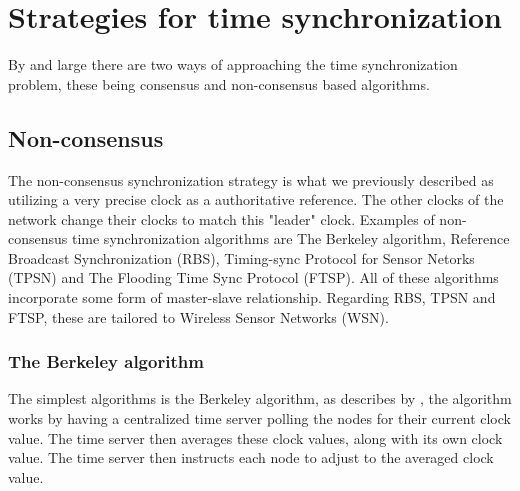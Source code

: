 \documentclass[a4paper,12pt]{article}
\begin{document}
\section{Strategies for time synchronization}


By and large there are two ways of approaching the time synchronization problem, these being consensus and non-consensus based algorithms.

    \subsection{Non-consensus}
    The non-consensus synchronization strategy is what we previously described as utilizing a very precise clock as a authoritative reference. The other clocks of the network change their clocks to match this "leader" clock.
    Examples of non-consensus time synchronization algorithms are The Berkeley algorithm, Reference Broadcast Synchronization (RBS), Timing-sync Protocol for Sensor Netorks (TPSN) and The Flooding Time Sync Protocol (FTSP). All of these algorithms incorporate some form of master-slave relationship. Regarding RBS, TPSN and FTSP, these are tailored to Wireless Sensor Networks (WSN).
    
    \subsubsection{The Berkeley algorithm} The simplest algorithms is the Berkeley algorithm, as describes by \citet{Gusella89}, the algorithm works by having a centralized time server polling the nodes for their current clock value. The time server then averages these clock values, along with its own clock value. The time server then instructs each node to adjust to the averaged clock value. 
\end{document}
